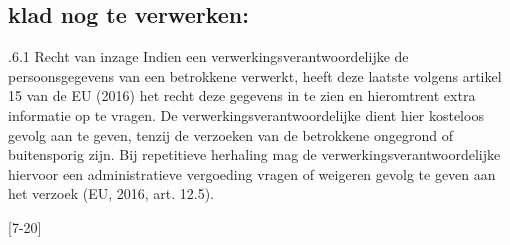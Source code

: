 \subsection{klad nog te verwerken: }
.6.1 Recht van inzage
Indien een verwerkingsverantwoordelijke de persoonsgegevens van een betrokkene verwerkt, heeft deze laatste volgens artikel 15 van de EU (2016) het recht deze gegevens in te
zien en hieromtrent extra informatie op te vragen.
De verwerkingsverantwoordelijke dient hier kosteloos gevolg aan te geven, tenzij de
verzoeken van de betrokkene ongegrond of buitensporig zijn. Bij repetitieve herhaling
mag de verwerkingsverantwoordelijke hiervoor een administratieve vergoeding vragen of
weigeren gevolg te geven aan het verzoek (EU, 2016, art. 12.5).


[7-20]
